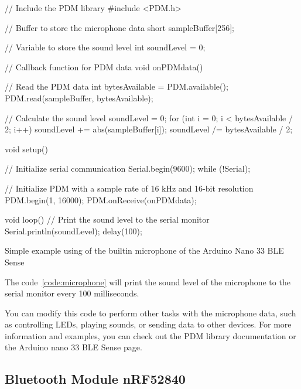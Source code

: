 \begin{code}
    \begin{Arduino}
        // Include the PDM library
        #include <PDM.h>
        
        // Buffer to store the microphone data
        short sampleBuffer[256];
        
        // Variable to store the sound level
        int soundLevel = 0;
        
        // Callback function for PDM data
        void onPDMdata() {
            // Read the PDM data
            int bytesAvailable = PDM.available();
            PDM.read(sampleBuffer, bytesAvailable);
            
            // Calculate the sound level
            soundLevel = 0;
            for (int i = 0; i < bytesAvailable / 2; i++) {
                soundLevel += abs(sampleBuffer[i]);
            }
            soundLevel /= bytesAvailable / 2;
        }
        
        void setup() {
            // Initialize serial communication
            Serial.begin(9600);
            while (!Serial);
            
            // Initialize PDM with a sample rate of 16 kHz and 16-bit resolution
            PDM.begin(1, 16000);
            PDM.onReceive(onPDMdata);
        }
        
        void loop() {
            // Print the sound level to the serial monitor
            Serial.println(soundLevel);
            delay(100);
        }
    \end{Arduino}
    \caption{Simple example using of the builtin microphone of the Arduino Nano 33 BLE Sense}\label{code:microphone}
\end{code}


The code~\ref{code:microphone} will print the sound level of the microphone to the serial monitor every 100 milliseconds. 

You can modify this code to perform other tasks with the microphone data, such as controlling LEDs, playing sounds, or sending data to other devices. For more information and examples, you can check out the PDM library documentation or the Arduino nano 33 BLE Sense page. 



\subsection{Bluetooth Module nRF52840}


